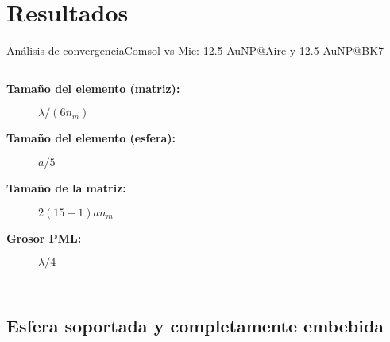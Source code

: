 

\section{Resultados}

    \begin{frame}{Análisis de convergencia}{Comsol vs Mie: 12.5 AuNP$@$Aire  y 12.5 AuNP$@$BK7}
    \begin{center}
        \begin{columns}
      \begin{description}
      \item[\textbf{Tamaño del elemento (matriz):}] $\lambda/(6 n_m)$
      \item[\textbf{Tamaño del elemento (esfera):}] $a/5$
      \item[\textbf{Tamaño de la matriz:}] $2(15+1)an_m$
      \item[\textbf{Grosor PML:}] $\lambda/4$
      \end{description}
        \centering\vspace*{-2em}
      \begin{figure}[h!]
        \def\svgwidth{1\textwidth}\footnotesize %
    \end{figure}
    \end{columns}
      \begin{figure}[h!]\scriptsize
        \def\svgwidth{.6\textwidth} %
    \end{figure}
    \end{center}
    \end{frame}

  \subsection{Esfera soportada y completamente embebida}
